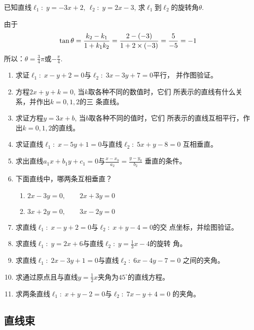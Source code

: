 \begin{example}
    已知直线$\ell_1:\; y=-3x+2$, $\ell_2:\; y=2x-3$, 
求$\ell_1$到$\ell_2$的旋转角$\theta$.
\end{example}

\begin{solution}
由于
\[\tan\theta=\dfrac{k_2-k_1}{1+k_1k_2}=\dfrac{2-(-3)}{1+2\times (-3)}=\dfrac{5}{-5}=-1\]
所以：$\theta=\frac{3}{4}\pi$或$-\frac{\pi}{4}$.
\end{solution}

\begin{ex}
\begin{enumerate}
    \item 求证$\ell_1:\; x-y+2=0$与$\ell_2:\;3x-3y+7=0$平行，
    并作图验证。
    \item 方程$2x+y+k=0$, 当$k$取各种不同的数值时，它们
    所表示的直线有什么关系，并作出$k=0,1,2$的三
    条直线。
    \item 求证方程$y=3x+b$, 当$b$取各种不同的值时，它们
    所表示的直线互相平行，作出$k=0,1,2$的直线。
    \item 求证直线$\ell_1:\; x-5y+1=0$与直线$\ell_2:\; 5x+y-8=0$
    互相垂直。
     \item 求出直线$a_1x+b_1y+c_1=0$与$\frac{x-x_0}{a_2}=\frac{y-y_0}{b_2}$
    垂直的条件。
    \item 下面直线中，哪两条互相垂直？
\begin{enumerate}
    \item $2x-3y=0,\qquad 2x+3y=0$
    \item $3x+2y=0,\qquad 3x-2y=0$
\end{enumerate}

    \item 求直线$\ell_1:\; x-y+2=0$与$\ell_2:\; x+y-4=0$的交
    点坐标，并绘图验证。
    \item 求直线$\ell_1:\; y=2x+6$与直线$\ell_2:\; y=\frac{1}{3}x-4$的旋转
    角。
\item 求直线$\ell_1:\; 2x-3y+1=0$与直线$\ell_2:\; 6x-4y-7=0$
之间的夹角。
\item 求通过原点且与直线$y=\frac{1}{2}x$夹角为$45^{\circ}$的直线方程。
\item 求两条直线$\ell_1:\; x+y-2=0$与$\ell_2:\; 7x-y+4=0$
的夹角。
\end{enumerate}
\end{ex}


\subsection{直线束}



